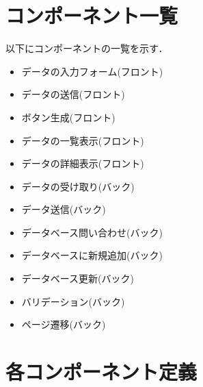 \documentclass[a4paper, titlepage]{jsarticle}
\begin{document}
\clearpage
\section{コンポーネント一覧}
以下にコンポーネントの一覧を示す．
\begin{itemize}
  \item データの入力フォーム(フロント)
  \item データの送信(フロント)
  \item ボタン生成(フロント)
  \item データの一覧表示(フロント)
  \item データの詳細表示(フロント)
  \item データの受け取り(バック)
  \item データ送信(バック)
  \item データベース問い合わせ(バック)
  \item データベースに新規追加(バック)
  \item データベース更新(バック)
  \item バリデーション(バック)
  \item ページ遷移(バック)
\end{itemize}

\clearpage
\section{各コンポーネント定義}
\end{document}
